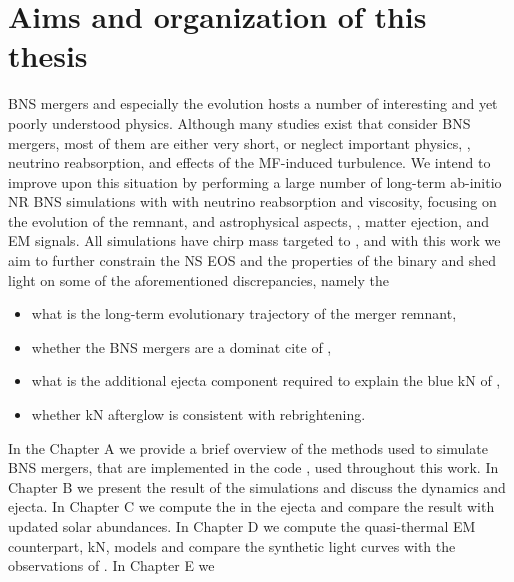 
\section{Aims and organization of this thesis}

\ac{BNS} mergers and especially the \pmerg{} evolution hosts a number of interesting 
and yet poorly understood physics. Although many studies exist that consider \ac{BNS} mergers, 
most of them are either very short, or neglect important physics, \eg, neutrino reabsorption, 
and effects of the \ac{MF}-induced turbulence. 
%
We intend to improve upon this situation by performing a large number of long-term ab-initio 
\ac{NR} \ac{BNS} simulations with with neutrino reabsorption and viscosity, focusing on the 
\pmerg{} evolution of the remnant, and astrophysical aspects, \ie, matter ejection, 
\rproc{} \nuc{} and \ac{EM} signals. 
%
All simulations have chirp mass targeted to \GW{}, and with this work we aim to further 
constrain the \ac{NS} \ac{EOS} and the properties of the binary and shed light on 
some of the aforementioned discrepancies, namely the 
\begin{itemize}
    \item what is the long-term evolutionary trajectory of the merger remnant,
    \item whether the \ac{BNS} mergers are a dominat cite of \rproc{}, 
    \item what is the additional ejecta component required to explain the blue \ac{kN} of \AT{}, 
    \item whether \ac{kN} afterglow is consistent with \GRB{} rebrightening.
\end{itemize}

In the Chapter A we provide a brief overview of the methods used to simulate \ac{BNS} mergers, 
that are implemented in the code \wisky{}, used throughout this work.
In Chapter B we present the result of the simulations and discuss the dynamics and ejecta.
In Chapter C we compute the \rproc{} \nuc{} in the ejecta and compare the result with updated 
solar abundances.
In Chapter D we compute the quasi-thermal \ac{EM} counterpart, \ac{kN}, models and compare 
the synthetic light curves with the observations of \AT{}.
In Chapter E we 



